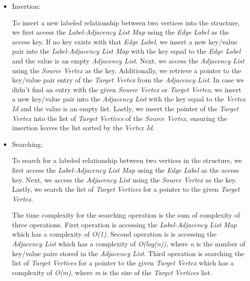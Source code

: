 {\begin{itemize}
At the core of the structure, we store the \textit{Adjacency List} as a key/value store to associate each \textit{Source Vertex} with a corresponding sorted list of \textit{Target Vertices}. Each element of the list of \textit{Target Vertices}, is a direct pointer towards the key/value pair of the referenced \textit{Target Vertex} in the \textit{Adjacency List}.

In (\ref{fig_adjacencyList_physical}), the \textit{Label-Adjacency List Map} is a key/value store we use to associate every \textit{Edge Label} with an \textit{Adjacency List}. Each \textit{Adjacency List} will store the edge between the \textit{Source Vertex} and \textit{Target Vertex} which is labeled with the \textit{Edge Label} it's associated with.

\item{Insertion:}

To insert a new labeled relationship between two vertices into the structure, we first access the \textit{Label-Adjacency List Map} using the \textit{Edge Label} as the access key. If no key exists with that \textit{Edge Label}, we insert a new key/value pair into the \textit{Label-Adjacency List Map} with the key equal to the \textit{Edge Label} and the value is an empty \textit{Adjacency List}. Next, we access the \textit{Adjacency List} using the \textit{Source Vertex} as the key. Additionally, we retrieve a pointer to the key/value pair entry of the \textit{Target Vertex} from the \textit{Adjacency List}. In case we didn't find an entry with the given \textit{Source Vertex} or \textit{Target Vertex}, we insert a new key/value pair into the \textit{Adjacency List} with the key equal to the \textit{Vertex Id} and the value is an empty list. Lastly, we insert the pointer of the \textit{Target Vertex} into the list of \textit{Target Vertices} of the \textit{Source Vertex}, ensuring the insertion leaves the list sorted by the \textit{Vertex Id}.

\item{Searching:}

To search for a labeled relationship between two vertices in the structure, we first access the \textit{Label-Adjacency List Map} using the \textit{Edge Label} as the access key. Next, we access the \textit{Adjacency List} using the \textit{Source Vertex} as the key. Lastly, we search the list of \textit{Target Vertices} for a pointer to the given \textit{Target Vertex}.

The time complexity for the searching operation is the sum of complexity of three operations. First operation is accessing the \textit{Label-Adjacency List Map} which has a complexity of \textit{O(1)}. Second operation is is accessing the \textit{Adjacency List} which has a complexity of \textit{O(log(n))}, where \textit{n} is the number of key/value pairs stored in the \textit{Adjacency List}. Third operation is searching the list of \textit{Target Vertices} for a pointer to the given \textit{Target Vertex} which has a complexity of \textit{O(m)}, where \textit{m} is the size of the \textit{Target Vertices} list.


\end{itemize}}
